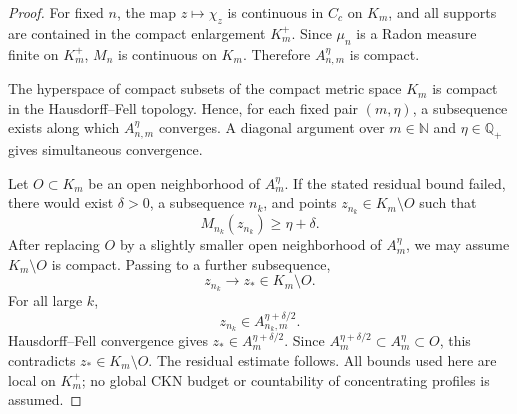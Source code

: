 \documentclass[11pt]{amsart}
\numberwithin{equation}{section}
\theoremstyle{plain}
\theoremstyle{definition}
\theoremstyle{remark}
\begin{document}
\begin{proof}
For fixed \(n\), the map \(z\mapsto\chi_z\) is continuous in \(C_c\) on
\(K_m\), and all supports are contained in the compact enlargement \(K_m^+\).
Since \(\mu_n\) is a Radon measure finite on \(K_m^+\), \(M_n\) is continuous
on \(K_m\).  Therefore \(A_{n,m}^{\eta}\) is compact.

The hyperspace of compact subsets of the compact metric space \(K_m\) is
compact in the Hausdorff--Fell topology.  Hence, for each fixed pair
\((m,\eta)\), a subsequence exists along which \(A_{n,m}^{\eta}\) converges.
A diagonal argument over \(m\in\mathbb N\) and
\(\eta\in\mathbb Q_+\) gives simultaneous convergence.

Let \(O\subset K_m\) be an open neighborhood of \(A_m^\eta\).  If the stated
residual bound failed, there would exist \(\delta>0\), a subsequence
\(n_k\), and points \(z_{n_k}\in K_m\setminus O\) such that
\[
   M_{n_k}(z_{n_k})\ge\eta+\delta .
\]
After replacing \(O\) by a slightly smaller open neighborhood of \(A_m^\eta\),
we may assume \(K_m\setminus O\) is compact.  Passing to a further subsequence,
\[
   z_{n_k}\to z_*\in K_m\setminus O .
\]
For all large \(k\),
\[
   z_{n_k}\in A_{n_k,m}^{\eta+\delta/2}.
\]
Hausdorff--Fell convergence gives \(z_*\in A_m^{\eta+\delta/2}\).  Since
\(A_m^{\eta+\delta/2}\subset A_m^\eta\subset O\), this contradicts
\(z_*\in K_m\setminus O\).  The residual estimate follows.  All bounds used
here are local on \(K_m^+\); no global CKN budget or countability of concentrating
profiles is assumed.
\end{proof}
\end{document}
